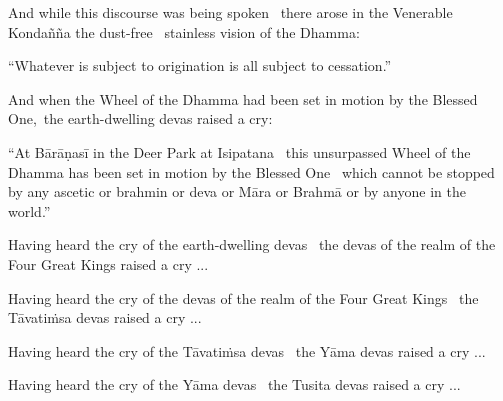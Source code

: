 \medskip

\begin{english-hang}
  And while this discourse was being spoken \breathmark\ there arose in the Venerable Kondañña the dust-free \breathmark\ stainless vision of the Dhamma:
\end{english-hang}

\medskip

\begin{english-hang}
  ``Whatever is subject to origination is all subject to cessation.''
\end{english-hang}

\medskip

\begin{english-hang}
  And when the Wheel of the Dhamma had been set in motion by the Blessed One, the earth-dwelling devas raised a cry:
\end{english-hang}

\medskip

\begin{english-hang}
  ``At Bārāṇasī in the Deer Park at Isipatana \breathmark\ this unsurpassed Wheel of the Dhamma has been set in motion by the Blessed One \breathmark\ which cannot be stopped by any ascetic or brahmin or deva or Māra or Brahmā or by anyone in the world.''
\end{english-hang}

\medskip

\begin{english-hang}
  Having heard the cry of the earth-dwelling devas \breathmark\ the devas of the realm of the Four Great Kings raised a cry ...
\end{english-hang}

\medskip

\begin{english-hang}
  Having heard the cry of the devas of the realm of the Four Great Kings \breathmark\ the Tāvatiṁsa devas raised a cry ...
\end{english-hang}

\medskip

\begin{english-hang}
  Having heard the cry of the Tāvatiṁsa devas \breathmark\ the Yāma devas raised a cry ...
\end{english-hang}

\medskip

\begin{english-hang}
  Having heard the cry of the Yāma devas \breathmark\ the Tusita devas raised a cry ...
\end{english-hang}

